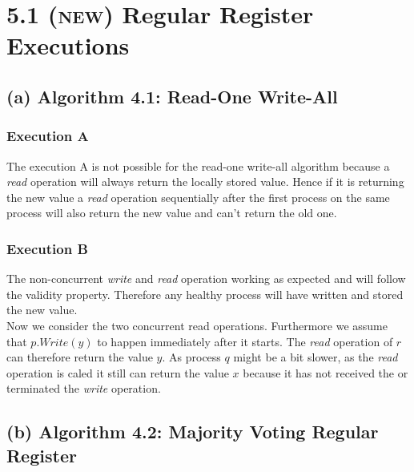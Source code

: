 \documentclass{article}
\begin{document}
	\pagestyle{fancy}
	\section*{5.1 (\textsc{new}) Regular Register Executions}
	\begin{adjustwidth}{2em}{2em}
		\subsection*{(a) Algorithm 4.1: Read-One Write-All}
		\begin{adjustwidth}{1em}{2em}
			\subsubsection*{Execution A}
			\begin{adjustwidth}{1em}{}
				The execution A is not possible for the read-one write-all algorithm because a \textit{read} operation will always return the locally stored value. Hence if it is returning the new value a \textit{read} operation sequentially after the first process on the same process will also return the new value and can't return the old one.
			\end{adjustwidth}
			\subsubsection*{Execution B}
			\begin{adjustwidth}{1em}{}
				The non-concurrent \textit{write} and \textit{read} operation working as expected and will follow the validity property. Therefore any healthy process will have written and stored the new value. \\
				Now we consider the two concurrent read operations. Furthermore we assume that $p.\textit{Write}(y)$ to happen immediately after it starts. The \textit{read} operation of $r$ can therefore return the value $y$. As process $q$ might be a bit slower, as the \textit{read} operation is caled it still can return the value $x$ because it has not received the or terminated the \textit{write} operation.
			\end{adjustwidth}
		\end{adjustwidth}
		\subsection*{(b) Algorithm 4.2: Majority Voting Regular Register}
		\begin{adjustwidth}{1em}{2em}

\end{adjustwidth}
\end{adjustwidth}
\end{document}

